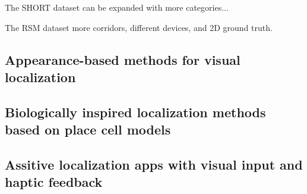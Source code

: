 The SHORT dataset can be expanded with more categories...

The RSM dataset more corridors, different devices, and 2D ground truth.

\subsection{Appearance-based methods for visual localization}

\subsection{Biologically inspired localization methods based on place cell models}

\subsection{Assitive localization apps with visual input and haptic feedback}


